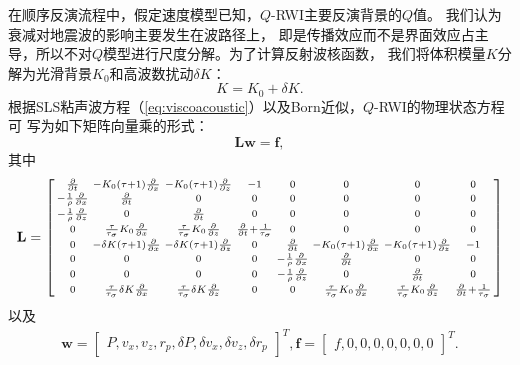 在顺序反演流程中，假定速度模型已知，$Q$-RWI主要反演背景的$Q$值。
我们认为衰减对地震波的影响主要发生在波路径上，
即是传播效应而不是界面效应占主导，所以不对$Q$模型进行尺度分解。为了计算反射波核函数，
我们将体积模量$K$分解为光滑背景$K_0$和高波数扰动$\delta K$：
\begin{equation}
	K = K_0 + \delta K.
\end{equation}
根据SLS粘声波方程（\ref{eq:viscoacoustic}）以及Born近似，$Q$-RWI的物理状态方程可
写为如下矩阵向量乘的形式：
\begin{equation}
    \mathbf{L}\mathbf{w} = \mathbf{f},
    \label{eq:state}
\end{equation}
其中
    \begin{eqnarray*}
        \mathbf{L}= 
        \begin{bmatrix}
            \begin{smallmatrix}
            \frac{\partial}{\partial t} &-K_0(\tau +1)\frac{\partial}{\partial x}
            &-K_0(\tau +1)\frac{\partial}{\partial z} &-1 &0 &0 &0 &0\cr
            -\frac{1}{\rho}\frac{\partial}{\partial x} &\frac{\partial}{\partial t} &0
            &0 &0 &0 &0 &0\cr
            -\frac{1}{\rho}\frac{\partial}{\partial z} &0 &\frac{\partial}{\partial t}
            &0 &0 &0 &0 &0\cr
            0 & \frac{\tau}{\tau_\sigma}K_0\frac{\partial}{\partial x}
            &\frac{\tau}{\tau_\sigma}K_0\frac{\partial}{\partial z}
            &\frac{\partial}{\partial t}+\frac{1}{\tau_\sigma} &0 &0 &0 &0 \cr
            0 &-\delta K(\tau+1)\frac{\partial}{\partial x} &-\delta
            K(\tau+1)\frac{\partial}{\partial z} &0 &\frac{\partial}{\partial t}
            &-K_0(\tau +1)\frac{\partial}{\partial x} &-K_0(\tau
            +1)\frac{\partial}{\partial z} &-1 \cr
            0 &0 &0 &0 &-\frac{1}{\rho}\frac{\partial}{\partial x}
            &\frac{\partial}{\partial t} &0 &0\cr
            0 &0 &0 &0 &-\frac{1}{\rho}\frac{\partial}{\partial z} &0
            &\frac{\partial}{\partial t} &0\cr
            0 &\frac{\tau}{\tau_\sigma}\delta K\frac{\partial}{\partial x}
            &\frac{\tau}{\tau_\sigma}\delta K\frac{\partial}{\partial z} &0 &0 
            & \frac{\tau}{\tau_\sigma}K_0\frac{\partial}{\partial x}
            &\frac{\tau}{\tau_\sigma}K_0\frac{\partial}{\partial z}
            &\frac{\partial}{\partial t}+\frac{1}{\tau_\sigma}
            \end{smallmatrix}
        \end{bmatrix}
    \end{eqnarray*}
以及
    \begin{eqnarray*}
        \mathbf{w} = 
        \begin{bmatrix}
            P , v_x , v_z , r_p ,\delta P ,\delta v_x ,\delta v_z
            ,\delta r_p
        \end{bmatrix}^T,
        \mathbf{f} = 
        \begin{bmatrix}
            f , 0, 0, 0 , 0, 0 , 0, 0
        \end{bmatrix}^T.
    \end{eqnarray*}
